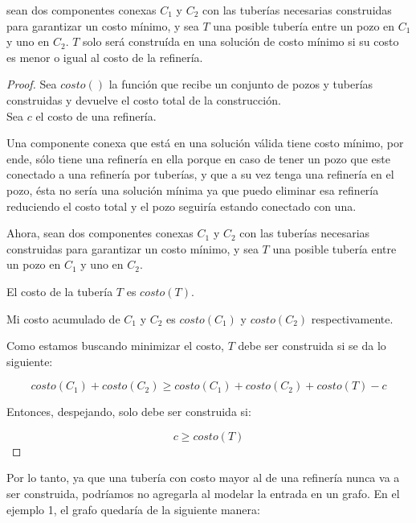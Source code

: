 \begin{lemma}
        sean dos componentes conexas $C_{1}$ y $C_{2}$ con las tuberías necesarias construidas para garantizar un costo mínimo, y sea $T$ una posible tubería entre un pozo en $C_{1}$ y uno en $C_{2}$. $T$ solo será construída en una solución de costo mínimo si su costo es menor o igual al costo de la refinería.
    \end{lemma}

\begin{proof}
Sea $costo()$ la función que recibe un conjunto de pozos y tuberías construidas y devuelve el costo total de la construcción. \\

Sea $c$ el costo de una refinería.

Una componente conexa que está en una solución válida tiene costo mínimo, por ende, sólo tiene una refinería en ella porque en caso de tener un pozo que este conectado a una refinería por tuberías, y que a su vez tenga una refinería en el pozo, ésta no sería una solución mínima ya que puedo eliminar esa refinería reduciendo el costo total y el pozo seguiría estando conectado con una.

Ahora, sean dos componentes conexas $C_{1}$ y $C_{2}$ con las tuberías necesarias construidas para garantizar un costo mínimo, y sea $T$ una posible tubería entre un pozo en $C_{1}$ y uno en $C_{2}$.

El costo de la tubería $T$ es $costo(T)$.

Mi costo acumulado de $C_{1}$ y $C_{2}$ es $costo(C_{1})$ y $costo(C_{2})$ respectivamente.

Como estamos buscando minimizar el costo, $T$ debe ser construida si se da lo siguiente:

$$costo(C_{1}) + costo(C_{2}) \geq costo(C_{1}) + costo(C_{2}) + costo(T) - c$$

Entonces, despejando, solo debe ser construida si:

$$c \geq costo(T)$$
\end{proof}

Por lo tanto, ya que una tubería con costo mayor al de una refinería nunca va a ser construida, podríamos no agregarla al modelar la entrada en un grafo. En el ejemplo 1, el grafo quedaría de la siguiente manera:


